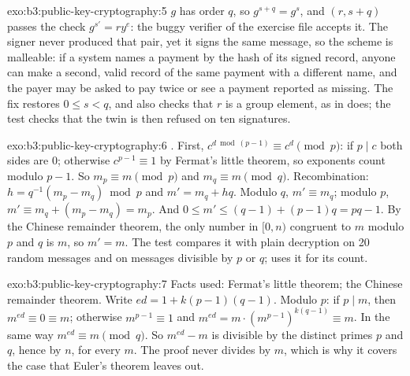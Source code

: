 \begin{solution}{exo:b3:public-key-cryptography:5}
$g$ has order $q$, so $g^{s + q} = g^s$, and $(r, s + q)$ passes the check $g^{s'} = r y^e$: the buggy verifier of the exercise file accepts it. The signer never produced that pair, yet it signs the same message, so the scheme is malleable: if a system names a payment by the hash of its signed record, anyone can make a second, valid record of the same payment with a different name, and the payer may be asked to pay twice or see a payment reported as missing. The fix restores $0 \le s < q$, and also checks that $r$ is a group element, as  in  does; the test checks that the twin is then refused on ten signatures.
\end{solution}

\begin{solution}{exo:b3:public-key-cryptography:6}
. First, $c^{d \bmod (p - 1)} \equiv c^d \pmod p$: if $p \mid c$ both sides are 0; otherwise $c^{p-1} \equiv 1$ by Fermat's little theorem, so exponents count modulo $p - 1$. So $m_p \equiv m \pmod p$ and $m_q \equiv m \pmod q$. Recombination: $h = q^{-1}(m_p - m_q) \bmod p$ and $m' = m_q + hq$. Modulo $q$, $m' \equiv m_q$; modulo $p$, $m' \equiv m_q + (m_p - m_q) = m_p$. And $0 \le m' \le (q - 1) + (p - 1)q = pq - 1$. By the Chinese remainder theorem, the only number in $[0, n)$ congruent to $m$ modulo $p$ and $q$ is $m$, so $m' = m$. The test compares it with plain decryption on 20 random messages and on messages divisible by $p$ or $q$;  uses it for its count.
\end{solution}

\begin{solution}{exo:b3:public-key-cryptography:7}
Facts used: Fermat's little theorem; the Chinese remainder theorem. Write $ed = 1 + k(p - 1)(q - 1)$. Modulo $p$: if $p \mid m$, then $m^{ed} \equiv 0 \equiv m$; otherwise $m^{p-1} \equiv 1$ and $m^{ed} = m \cdot (m^{p-1})^{k(q-1)} \equiv m$. In the same way $m^{ed} \equiv m \pmod q$. So $m^{ed} - m$ is divisible by the distinct primes $p$ and $q$, hence by $n$, for every $m$. The proof never divides by $m$, which is why it covers the case that Euler's theorem leaves out.
\end{solution}

